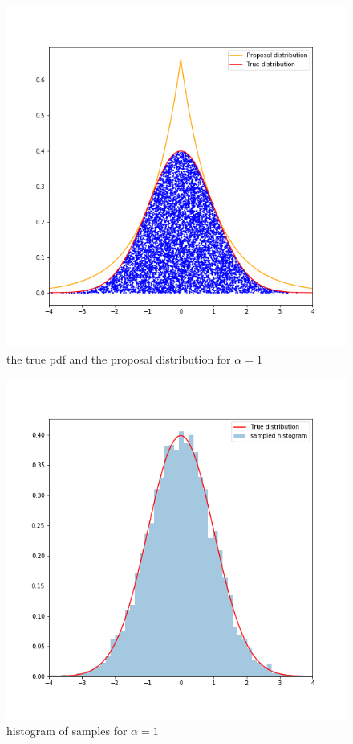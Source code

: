 \documentclass{article}
\begin{document}
\begin{figure}[h!]
\centering
\includegraphics[scale=0.4]{h4p1b3.png}
\caption{ the true pdf and the proposal distribution for $\alpha = 1$}
\end{figure}

\begin{figure}[h!]
\centering
\includegraphics[scale=0.4]{h4p1b4.png}
\caption{histogram of samples for $\alpha = 1$}
\end{figure}
\end{document}
